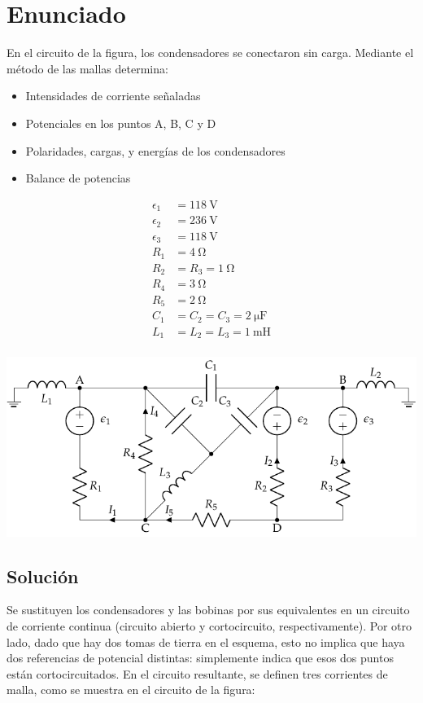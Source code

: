 \section{Enunciado}
En el circuito de la figura, los condensadores se conectaron sin
carga. Mediante el método de las mallas determina:
\begin{itemize}
\item Intensidades de corriente señaladas
\item Potenciales en los puntos A, B, C y D
\item Polaridades, cargas, y energías de los condensadores
\item Balance de potencias
\end{itemize}
\begin{minipage}[c]{0.3\linewidth}
  \begin{align*}
    \epsilon_{1}&=\qty{118}{\volt}\\
    \epsilon_{2}&=\qty{236}{\volt}\\
    \epsilon_{3}&=\qty{118}{\volt}\\
    R_{1}&= \qty{4}{\ohm}\\
    R_{2}&=R_{3}=\qty{1}{\ohm}\\
    R_{4}&= \qty{3}{\ohm}\\
    R_{5}&= \qty{2}{\ohm}\\
    C_{1}&=C_{2}=C_{3}=\qty{2}{\micro\farad}\\
    L_1 &= L_2 = L_3 = \qty{1}{\milli\henry}\\
  \end{align*}
\end{minipage}
\begin{minipage}[c]{0.7\linewidth}
  \includegraphics{figuras/mallas_condensadores.pdf}
\end{minipage}

\subsection*{Solución}
Se sustituyen los condensadores y las bobinas por sus equivalentes en un circuito de corriente continua (circuito abierto y cortocircuito, respectivamente). Por otro lado, dado que hay dos tomas de tierra en el esquema, esto no implica que haya dos referencias de potencial distintas: simplemente indica que esos dos puntos están cortocircuitados. En el circuito resultante, se definen tres corrientes de malla, como se muestra en el circuito de la figura:

